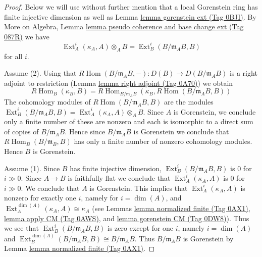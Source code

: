 \documentclass{amsart}
\theoremstyle{plain}
\theoremstyle{definition}
\theoremstyle{remark}
\numberwithin{equation}{subsection}
\def\Hom{\mathop{\mathrm{Hom}}\nolimits}
\def\Ext{\mathop{\mathrm{Ext}}\nolimits}
\begin{document}
\begin{proof}
Below we will use without further mention that a local Gorenstein ring
has finite injective dimension as well as Lemma \href{https://stacks.math.columbia.edu/tag/0BJI}{lemma gorenstein ext (Tag 0BJI)}.
By More on Algebra, Lemma
\href{https://stacks.math.columbia.edu/tag/087R}{lemma pseudo coherence and base change ext (Tag 087R)}
we have
$$
\Ext^i_A(\kappa_A, A) \otimes_A B =
\Ext^i_B(B/\mathfrak m_A B, B)
$$
for all $i$.

\medskip\noindent
Assume (2). Using that
$R\Hom(B/\mathfrak m_A B, -) : D(B) \to D(B/\mathfrak m_A B)$ is a
right adjoint to restriction (Lemma \href{https://stacks.math.columbia.edu/tag/0A70}{lemma right adjoint (Tag 0A70)}) we obtain
$$
R\Hom_B(\kappa_B, B) =
R\Hom_{B/\mathfrak m_A B}(\kappa_B, R\Hom(B/\mathfrak m_A B, B))
$$
The cohomology modules of $R\Hom(B/\mathfrak m_A B, B)$ are the modules
$\Ext^i_B(B/\mathfrak m_A B, B) =
\Ext^i_A(\kappa_A, A) \otimes_A B$.
Since $A$ is Gorenstein, we conclude only a finite number of these are nonzero
and each is isomorphic to a direct sum of copies of $B/\mathfrak m_A B$.
Hence since $B/\mathfrak m_A B$ is Gorenstein we conclude that
$R\Hom_B(B/\mathfrak m_B, B)$ has only a finite number of nonzero
cohomology modules. Hence $B$ is Gorenstein.

\medskip\noindent
Assume (1). Since $B$ has finite injective dimension,
$\Ext^i_B(B/\mathfrak m_A B, B)$ is $0$ for $i \gg 0$.
Since $A \to B$ is faithfully flat
we conclude that $\Ext^i_A(\kappa_A, A)$ is $0$
for $i \gg 0$. We conclude that $A$ is Gorenstein. This implies that
$\Ext^i_A(\kappa_A, A)$ is nonzero for exactly one $i$,
namely for $i = \dim(A)$, and
$\Ext^{\dim(A)}_A(\kappa_A, A) \cong \kappa_A$
(see Lemmas \href{https://stacks.math.columbia.edu/tag/0AX1}{lemma normalized finite (Tag 0AX1)}, \href{https://stacks.math.columbia.edu/tag/0AWS}{lemma apply CM (Tag 0AWS)}, and
\href{https://stacks.math.columbia.edu/tag/0DW8}{lemma gorenstein CM (Tag 0DW8)}).
Thus we see that
$\Ext^i_B(B/\mathfrak m_A B, B)$ is zero except for one $i$,
namely $i = \dim(A)$ and
$\Ext^{\dim(A)}_B(B/\mathfrak m_A B, B) \cong B/\mathfrak m_A B$.
Thus $B/\mathfrak m_A B$ is Gorenstein by
Lemma \href{https://stacks.math.columbia.edu/tag/0AX1}{lemma normalized finite (Tag 0AX1)}.
\end{proof}
\end{document}
